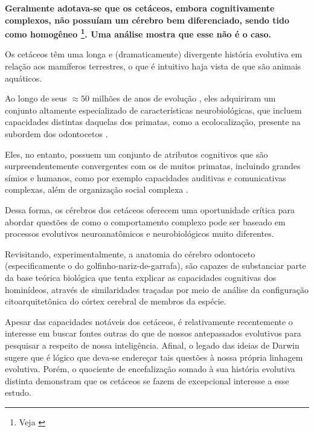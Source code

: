 \documentclass[
    12pt,
    openright,
    twoside,
    a4paper,
    english,
    french,
    spanish,
    brazil
    ]{abntex2}
\begin{document}
\frenchspacing



\imprimirfolhaderosto*

\textual

\textbf{%
    Geralmente adotava-se que os cetáceos, embora cognitivamente complexos, não
    possuíam um cérebro bem diferenciado, sendo tido como homogêneo%
    \footnote{Veja \cite{glezer1988implications}}. Uma análise mostra que esse
    não é o caso.
}

Os cetáceos têm uma longa e (dramaticamente) divergente história evolutiva em
relação aos mamíferos terrestres, o que é intuitivo haja vista de que são
animais aquáticos.

Ao longo de seus $\approx 50$ milhões de anos de evolução
\cite{gingerich1998likelihood}, eles adquiriram um conjunto altamente
especializado de características neurobiológicas, que incluem capacidades
distintas daquelas dos primatas, como a ecolocalização, presente na subordem
dos odontocetos \cite{SensoryS50:online}.

Eles, no entanto, possuem um conjunto de atributos cognitivos que são
surpreendentemente convergentes com os de muitos primatas, incluindo grandes
símios e humanos, como por exemplo capacidades auditivas e comunicativas
complexas, além de organização social complexa \cite{marino2002convergence,
sayigh2014cetacean}.

Dessa forma, os cérebros dos cetáceos oferecem uma oportunidade crítica para
abordar questões de como o comportamento complexo pode ser baseado em
processos evolutivos neuroanatômicos e neurobiológicos muito diferentes.

Revisitando, experimentalmente, a anatomia do cérebro odontoceto
(especificamente o do golfinho-nariz-de-garrafa),  são capazes
de substanciar parte da base teórica biológica que tenta explicar as
capacidades cognitivas dos hominídeos, através de similaridades traçadas por
meio de análise da configuração citoarquitetônica do córtex cerebral de membros
da espécie.

Apesar das capacidades notáveis dos cetáceos, é relativamente recentemente o
interesse em buscar fontes outras do que de nossos antepassados evolutivos para
pesquisar a respeito de nossa inteligência. Afinal, o legado das ideias de
Darwin sugere que é lógico que deva-se endereçar tais questões à nossa própria
linhagem evolutiva. Porém, o quociente de encefalização somado à sua história
evolutiva distinta demonstram que os cetáceos se fazem de excepcional interesse
a esse estudo.
\end{document}
